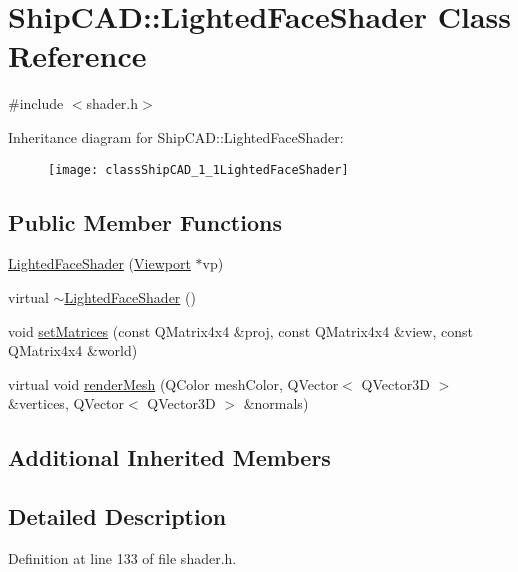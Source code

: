 \hypertarget{classShipCAD_1_1LightedFaceShader}{}\section{Ship\+C\+AD\+:\+:Lighted\+Face\+Shader Class Reference}
\label{classShipCAD_1_1LightedFaceShader}


{\ttfamily \#include $<$shader.\+h$>$}

Inheritance diagram for Ship\+C\+AD\+:\+:Lighted\+Face\+Shader\+:\begin{figure}[H]
\begin{center}
\leavevmode
\texttt{[image: classShipCAD\_1\_1LightedFaceShader]}
\end{center}
\end{figure}
\subsection*{Public Member Functions}
\begin{DoxyCompactItemize}
\item 
\hyperlink{classShipCAD_1_1LightedFaceShader_a2af0e951890116c518c54c8afe978a3a}{Lighted\+Face\+Shader} (\hyperlink{classShipCAD_1_1Viewport}{Viewport} $\ast$vp)
\item 
virtual \hyperlink{classShipCAD_1_1LightedFaceShader_a6ce7e752639fd1c8dd12b721279ac814}{$\sim$\+Lighted\+Face\+Shader} ()
\item 
void \hyperlink{classShipCAD_1_1LightedFaceShader_a0a5515fd6bcaf380de2ff15b42261f83}{set\+Matrices} (const Q\+Matrix4x4 \&proj, const Q\+Matrix4x4 \&view, const Q\+Matrix4x4 \&world)
\item 
virtual void \hyperlink{classShipCAD_1_1LightedFaceShader_abd4fe9c01a7e09aa46f3017f014018a8}{render\+Mesh} (Q\+Color mesh\+Color, Q\+Vector$<$ Q\+Vector3D $>$ \&vertices, Q\+Vector$<$ Q\+Vector3D $>$ \&normals)
\end{DoxyCompactItemize}
\subsection*{Additional Inherited Members}


\subsection{Detailed Description}


Definition at line 133 of file shader.\+h.



